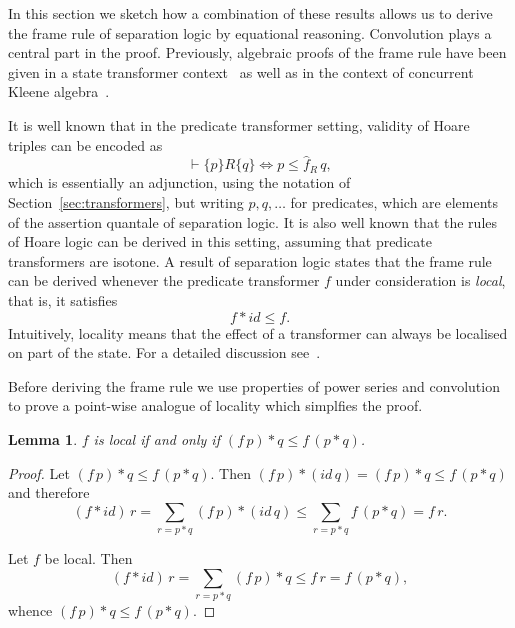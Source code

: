 \documentclass[12pt]{article}
\newtheorem{lemma}{Lemma}
\theoremstyle{definition}
\begin{document}
In this section we sketch how a combination of these results allows us
to derive the frame rule of separation logic by equational
reasoning. Convolution plays a central part in the proof.  Previously,
algebraic proofs of the frame rule have been given in a state
transformer context~\cite{COY07} as well as in the context of
concurrent Kleene algebra~\cite{HMSW11}.

It is well known that in the predicate transformer setting, validity
of Hoare triples can be encoded as
\begin{equation*}
  \vdash \{p\}R\{q\}\Leftrightarrow p\le \hat{f}_R\, q,
\end{equation*}
which is essentially an adjunction, using the notation of Section~\ref{sec:transformers},
but writing $p,q,\dots$ for predicates, which are elements of the
assertion quantale of separation logic. It is also well known that the
rules of Hoare logic can be derived in this setting, assuming that
predicate transformers are isotone. A result of separation logic
states that the frame rule can be derived whenever the predicate
transformer $f$ under consideration is \emph{local}, that is, it
satisfies
\begin{equation*}
  f\ast\mathit{id}\le f.
\end{equation*}
Intuitively, locality means that the effect of a transformer can
always be localised on part of the state. For a detailed discussion
see~\cite{COY07}.

Before deriving the frame rule we use properties of power series and
convolution to prove a point-wise analogue of locality which simplfies
the proof.
\begin{lemma}\label{lem:local-prop}
  $f$ is local if and only if $(f\, p) \ast q \le f\, (p\ast q)$.
\end{lemma}
\begin{proof}
  Let $(f\, p)\ast q\le  f\, (p\ast q)$. Then 
$(f\, p)\ast (\mathit{id}\, q) = (f\, p) \ast q \le f\, (p\ast q)$
 and therefore 
\begin{equation*}
    (f\ast \mathit{id})\, r 
  = \sum_{r=p\ast q} (f\, p)\ast (\mathit{id}\, q)
  \le \sum_{r=p\ast q}  f\, (p\ast q) = f\, r.
\end{equation*}

Let $f$ be local.  Then 
\begin{equation*}
(f\ast \mathit{id})\, r = \sum_{r=p\ast q} (f\, p) \ast q \le f\, r = f\, (p\ast q),
\end{equation*}
 whence $(f\, p)\ast q\le f\, (p\ast q)$.
\end{proof}
\end{document}
